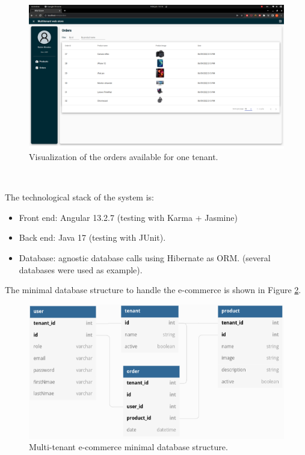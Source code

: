 \documentclass[12pt,english]{article} %
\begin{document}
\begin{figure}[H]
    \centering
    \includegraphics[scale=0.24]{img/mws/ecommerce-multi-tenancy-orders.png}
    \caption{Visualization of the orders available for one tenant.}
    \label{fig:ecommerce-multi-tenancy-orders}
\end{figure}

\

The technological stack of the system is:
\begin{itemize}
    \item Front end: Angular 13.2.7 (testing with Karma + Jasmine)
    \item Back end: Java 17 (testing with JUnit).
    \item Database: agnostic database calls using Hibernate as ORM. (several databases were used as example).
\end{itemize}

The minimal database structure to handle the e-commerce is shown in Figure \ref{fig:ecommerce-database-structure}.
\begin{figure}[H]
    \centering
    \includegraphics[scale=0.55]{img/mws/ecommerce-database-structure.png}
    \caption{Multi-tenant e-commerce minimal database structure.}
    \label{fig:ecommerce-database-structure}
\end{figure}
\end{document}
